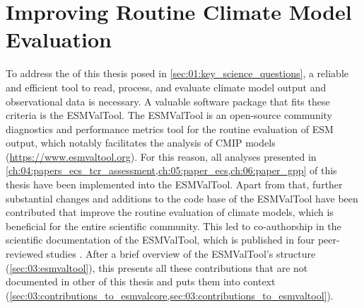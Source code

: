 
%



\chapter{Improving Routine Climate Model Evaluation}
\label{ch:03:esmvaltool}

To address the  of this thesis posed in
\cref{sec:01:key_science_questions}, a reliable and efficient tool to read,
process, and evaluate climate model output and observational data is necessary.
A valuable software package that fits these criteria is the \ac{ESMValTool}.
The \ac{ESMValTool} is an open-source community diagnostics and performance
metrics tool for the routine evaluation of \ac{ESM} output, which notably
facilitates the analysis of \ac{CMIP} models
(\url{https://www.esmvaltool.org}). For this reason, all analyses presented in
\cref{ch:04:papers_ecs_tcr_assessment,ch:05:paper_ecs,ch:06:paper_gpp} of this
thesis have been implemented into the \ac{ESMValTool}. Apart from that, further
substantial changes and additions to the code base of the \ac{ESMValTool} have
been contributed that improve the routine evaluation of climate models, which
is beneficial for the entire scientific community. This led to co-authorship in
the scientific documentation of the \ac{ESMValTool}, which is published in four
peer-reviewed studies \autocite{Eyring2020, Lauer2020, Righi2020, Weigel2020}.
After a brief overview of the \ac{ESMValTool}'s structure
(\cref{sec:03:esmvaltool}), this  presents all
these contributions that are not documented in other
 of this thesis and puts them into
context
(\cref{sec:03:contributions_to_esmvalcore,sec:03:contributions_to_esmvaltool}).


